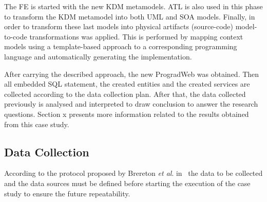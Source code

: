 \documentclass[a4paper,twoside]{article}
\begin{document}
The FE is started with the new KDM metamodels. ATL is also used in this phase to transform the KDM metamodel into both UML and SOA models. Finally, in order to transform these last models into physical artifacts (source-code) model-to-code transformations was applied. This is performed by mapping context models using a template-based approach to a corresponding
programming language and automatically generating the implementation.

After carrying the described approach, the new ProgradWeb was obtained. Then all embedded SQL statement, the created entities and the created services are collected according to the data collection plan. After that, the data collected previously is analysed and interpreted to draw conclusion to answer the research questions. Section x presents more information related to the results obtained from this case study.

\subsection{Data Collection} %
\label{sub:data_collection}

According to the protocol proposed by Brereton \textit{et al}. in~\cite{case-study-template-2008} the data to be collected and the data sources must be defined before starting the execution of the case study to ensure the future repeatability.
\end{document}
